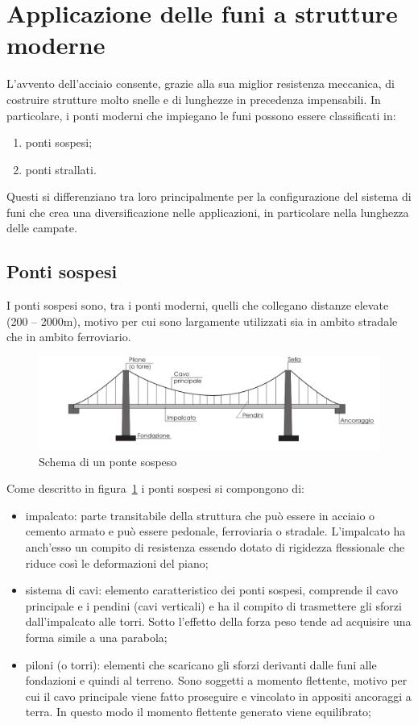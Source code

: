 \section{Applicazione delle funi a strutture moderne}
L'avvento dell'acciaio consente, grazie alla sua miglior resistenza meccanica, di costruire strutture molto snelle e di lunghezze in precedenza impensabili.
In particolare, i ponti moderni che impiegano le funi possono essere classificati in:
\begin{enumerate}
	\item ponti sospesi;
	\item ponti strallati.
\end{enumerate}

Questi si differenziano tra loro principalmente per la configurazione del sistema di funi che crea una diversificazione nelle applicazioni, in particolare nella lunghezza delle campate.

\subsection{Ponti sospesi}
I ponti sospesi sono, tra i ponti moderni, quelli che collegano distanze elevate (200 -- 2000\si{m}), motivo per cui sono largamente utilizzati sia in ambito stradale che in ambito ferroviario. 

\begin{figure}
	\centering
	\includegraphics[width=11.8cm, keepaspectratio]{Immagini/suspension_bridge}
	\caption{Schema di un ponte sospeso}
	\label{fig:ponte_sospeso}
\end{figure}


Come descritto in figura~\ref{fig:ponte_sospeso} i ponti sospesi si compongono di:
\begin{itemize}
	\item impalcato: parte transitabile della struttura che può essere in acciaio o cemento armato e può essere pedonale, ferroviaria o stradale. L'impalcato ha anch'esso un compito di resistenza essendo dotato di rigidezza flessionale che riduce così le deformazioni del piano;
	\item sistema di cavi: elemento caratteristico dei ponti sospesi, comprende il cavo principale e i pendini (cavi verticali) e ha il compito di trasmettere gli sforzi dall'impalcato alle torri. Sotto l'effetto della forza peso tende ad acquisire una forma simile a una parabola;
	\item piloni (o torri): elementi che scaricano gli sforzi derivanti dalle funi  alle fondazioni e quindi al terreno. Sono soggetti a momento flettente, motivo per cui il cavo principale viene fatto proseguire e vincolato in appositi ancoraggi a terra. In questo modo il momento flettente generato viene equilibrato;
\end{itemize}

